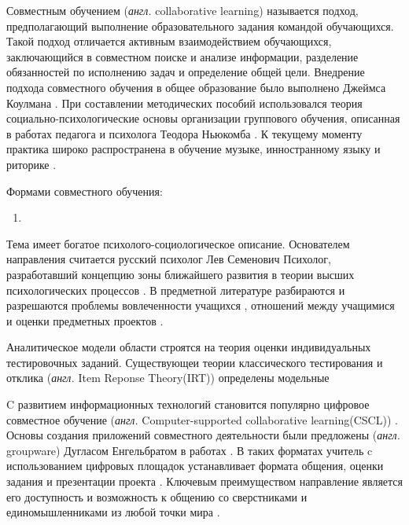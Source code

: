 Совместным обучением (\textit{англ.} collaborative learning) называется подход, 
предполагающий выполнение образовательного задания командой обучающихся. Такой подход отличается активным взаимодействием обучающихся,
заключающийся в совместном поиске и анализе информации, разделение обязанностей по исполнению задач
и определение общей цели. Внедрение подхода совместного обучения в общее образование было выполнено 
Джеймса Коулмана \cite{coleman1974youth}. При составлении методических пособий использовался теория
социально-психологические основы организации группового обучения, описанная в 
работах педагога и психолога Теодора Ньюкомба \cite{newcomb1953approach}. К текущему моменту 
практика широко распространена в обучение музыке, инностранному языку и
 риторике \cite{mazen2000transforming}.

Формами совместного обучения:\begin{enumerate}
    \item 

\end{enumerate}


Тема имеет богатое психолого-социологическое описание. Основателем направления считается 
русский психолог Лев Семенович Психолог, разработавший 
концепцию зоны ближайшего развития в теории высших психологических процессов \cite{vigotski2014}.
В предметной литературе разбираются и разрешаются проблемы вовлеченности учащихся \cite{rau1990humanizing},
отношений между учащимися \cite{flowers2015friendship} и 
оценки предметных проектов \cite{newcomb1953approach}.

Аналитическое модели области строятся на теория оценки индивидуальных тестировочных заданий. \cite{dillenbourg1999collaborative} 
Существующеи теории классического тестирования \cite{traub1997classical} и отклика (\textit{англ.} Item Reponse Theory(IRT))
\cite{lord2012applications}
определены модельные

C развитием информационных технологий становится популярно цифровое совместное обучение
(\textit{англ.} Computer-supported collaborative learning(CSCL)) \cite{strijbos2010assessment}. 
Основы создания приложений совместного деятельности были предложены (\textit{англ.} groupware) 
Дугласом Енгельбратом в работах \cite{engelbart1984collaboration} \cite{engelbart1992toward}.
В таких форматах учитель c использованием цифровых площадок
устанавливает формата общения, оценки задания и презентации проекта \cite{lu2010scaffolding}.
Ключевым преимуществом направление является его доступность
и возможность к общению со сверстниками и единомышленниками из любой точки мира
\cite{stahl2009practice}. 


